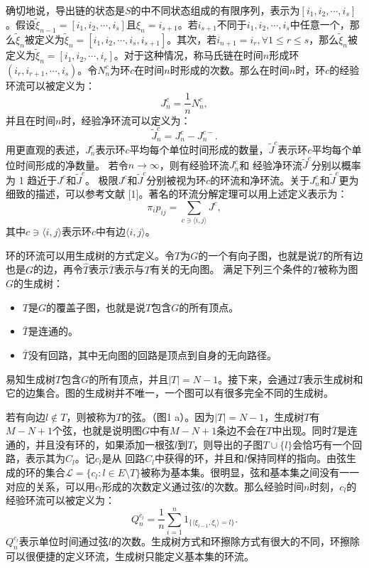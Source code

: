 确切地说，导出链的状态是$S$的中不同状态组成的有限序列，表示为$[i_1,i_2,\cdots,i_s]$。假设$\tilde{\xi}_{n-1}=[i_1,i_2,\cdots,i_s]$且$\xi_n = i_{s+1}$。若$i_{s+1}$不同于$i_1,i_2,\cdots,i_s$中任意一个，那么$\tilde{\xi}_n$被定义为$\tilde{\xi}_n = [i_1,i_2,\cdots,i_s,i_{s+1}]$。其次，若$i_{n+1}=i_r, \forall 1 \le r\le s$，那么$\tilde{\xi}_n$被定义为$\tilde{\xi}_n = [i_1,i_2,\cdots,i_r]$。对于这种情况，称马氏链在时间$n$形成环$(i_r,i_{r+1},\cdots,i_s)$。令$N^c_n$为环$c$在时间$n$时形成的次数。那么在时间$n$时，环$c$的经验环流可以被定义为：
\begin{equation*}
    J_n^c = \frac{1}{n}N^c_n,
\end{equation*}
并且在时间$n$时，经验净环流可以定义为：
\begin{equation*}
    \tilde{J}^c_n = J^c_n-J^{c-}_n.
\end{equation*}
用更直观的表述，$J^c_n$表示环$c$平均每个单位时间形成的数量，$\tilde{J}^c$表示环$c$平均每个单位时间形成的净数量。
若令$n\rightarrow\infty$，则有经验环流$J^c_n$和 经验净环流$\tilde{J}^c$分别以概率为 1 趋近于$J^c$和$\tilde{J}^c$。
极限$J^c$和$\tilde{J}^c$分别被视为环$c$的环流和净环流。关于$J^c_n$和$\tilde{J}^c$更为细致的描述，可以参考文献 [1]。著名的环流分解定理可以用上述定义表示为：
\begin{equation}\label{decomposition}
    \pi_ip_{ij} = \sum_{c\ni\langle i,j\rangle}J^c,
\end{equation}
其中$c \ni \langle i, j\rangle$表示环$c$中有边$\langle i, j\rangle$。

环的环流可以用生成树的方式定义。令$T$为$G$的一个有向子图，也就是说$T$的所有边也是$G$的边，再令$\hat{T}$表示$\bar{T}$表示与$T$有关的无向图。
满足下列三个条件的$T$被称为图$G$的生成树：
\begin{itemize}
    \item$T$是$G$的覆盖子图，也就是说$T$包含$G$的所有顶点。
    \item$\bar{T}$是连通的。
    \item$\bar{T}$没有回路，其中无向图的回路是顶点到自身的无向路径。
\end{itemize}

易知生成树$T$包含$G$的所有顶点，并且$|T| = N -1$。接下来，会通过$T$表示生成树和它的边集合。图的生成树并不唯一，一个图可以有很多完全不同的生成树。

若有向边$l \notin T$，则被称为$T$的弦。（图1 a）。因为$|T|= N-1$，生成树$T$有$M-N+1$个弦，也就是说明图$G$中有$M-N+1$条边不会在$T$中出现。同时$\bar{T}$是连通的，并且没有环的，如果添加一根弦$l$到$T$，则导出的子图$\overline{T \cup \{l\}}$会恰巧有一个回路，表示其为$C_l$。记$c_l$是从 回路$C_l$中获得的环，并且和$l$保持同样的指向。由弦生成的环的集合$\mathcal{L} = \{c_l: l\in E\setminus T\}$被称为基本集。很明显，弦和基本集之间没有一一对应的关系，可以用$c_l$形成的次数定义通过弦$l$的次数。那么经验时间$n$时刻，$c_l$的经验环流可以被定义为：
\begin{equation*}
    Q^{c_l}_n = \frac{1}{n}\sum_{i=1}^n1_{\{\langle\xi_{i-1},\xi_i\rangle=l\}}.
\end{equation*}
$Q^{c_l}_n$表示单位时间通过弦$l$的次数。生成树方式和环擦除方式有很大的不同，环擦除可以很便捷的定义环流，生成树只能定义基本集的环流。


